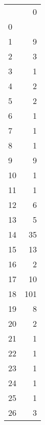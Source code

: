 \begin{tabular}{lr}
\toprule
   &    0 \\
0 &      \\
\midrule
1  &    9 \\
2  &    3 \\
3  &    1 \\
4  &    2 \\
5  &    2 \\
6  &    1 \\
7  &    1 \\
8  &    1 \\
9  &    9 \\
10 &    1 \\
11 &    1 \\
12 &    6 \\
13 &    5 \\
14 &   35 \\
15 &   13 \\
16 &    2 \\
17 &   10 \\
18 &  101 \\
19 &    8 \\
20 &    2 \\
21 &    1 \\
22 &    1 \\
23 &    1 \\
24 &    1 \\
25 &    1 \\
26 &    3 \\
\bottomrule
\end{tabular}
